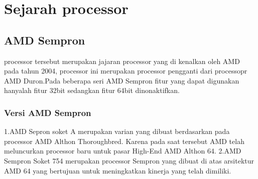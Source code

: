 \section {Sejarah processor}
	\subsection {AMD Sempron}
 	processor tersebut merupakan jajaran processor yang di kenalkan oleh AMD pada tahun 2004, processor ini merupakan processor pengganti dari processopr AMD Duron.Pada beberapa seri AMD Sempron fitur yang dapat digunakan hanyalah fitur 32bit sedangkan fitur 64bit dinonaktifkan.
	\subsubsection {Versi AMD Sempron}
	 1.AMD Sepron soket A merupakan varian yang dibuat berdasarkan pada processor AMD Althon Thoroughbred. Karena pada saat tersebut AMD telah meluncurkan processor baru untuk pasar High-End AMD Althon 64.
	 2.AMD Sempron Soket 754 merupakan processor Sempron yang dibuat di atas arsitektur AMD 64 yang bertujuan untuk meningkatkan kinerja yang telah dimiliki.
	 